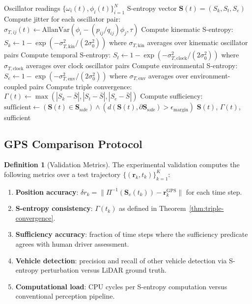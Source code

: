 \documentclass[twocolumn,10pt]{article}
\theoremstyle{definition}
\newtheorem{definition}[theorem]{Definition}
\theoremstyle{remark}
\newcommand{\Sent}{\mathbf{S}}
\begin{document}
\begin{algorithm}[t]
\caption{Real-Time S-Entropy Computation}
\label{alg:s-entropy}
\begin{algorithmic}[1]
\REQUIRE Oscillator readings $\{\omega_i(t), \phi_i(t)\}_{i=1}^N$
\ENSURE S-entropy vector $\Sent(t) = (S_k, S_t, S_e)$
\STATE Compute jitter for each oscillator pair:
  $\sigma_{T,ij}(t) \gets \mathrm{AllanVar}(\phi_i - (p_{ij}/q_{ij})\phi_j, \tau)$
\STATE Compute kinematic S-entropy:
  $S_k \gets 1 - \exp(-\sigma_{T,\mathrm{kin}}^2 / (2\sigma_0^2))$
  where $\sigma_{T,\mathrm{kin}}$ averages over kinematic oscillator pairs
\STATE Compute temporal S-entropy:
  $S_t \gets 1 - \exp(-\sigma_{T,\mathrm{clock}}^2 / (2\sigma_0^2))$
  where $\sigma_{T,\mathrm{clock}}$ averages over clock oscillator pairs
\STATE Compute environmental S-entropy:
  $S_e \gets 1 - \exp(-\sigma_{T,\mathrm{env}}^2 / (2\sigma_0^2))$
  where $\sigma_{T,\mathrm{env}}$ averages over environment-coupled pairs
\STATE Compute triple convergence:
  $\Gamma(t) \gets \max(|S_k - \bar{S}|, |S_t - \bar{S}|, |S_e - \bar{S}|)$
\STATE Compute sufficiency:
  $\mathrm{sufficient} \gets (\Sent(t) \in \Sent_{\mathrm{safe}})
  \wedge (d(\Sent(t), \partial\Sent_{\mathrm{safe}}) > \epsilon_{\mathrm{margin}})$
\RETURN $\Sent(t)$, $\Gamma(t)$, sufficient
\end{algorithmic}
\end{algorithm}

\subsection{GPS Comparison Protocol}

\begin{definition}[Validation Metrics]\label{def:validation}
The experimental validation computes the following metrics over a test
trajectory $\{(\mathbf{r}_k, t_k)\}_{k=1}^{K}$:
\begin{enumerate}[label=(\roman*)]
  \item \textbf{Position accuracy}: $\delta r_k = \|\Pi^{-1}(\Sent_e(t_k))
    - \mathbf{r}_k^{\mathrm{GPS}}\|$ for each time step.
  \item \textbf{S-entropy consistency}: $\Gamma(t_k)$ as defined in
    Theorem~\ref{thm:triple-convergence}.
  \item \textbf{Sufficiency accuracy}: fraction of time steps where the
    sufficiency predicate agrees with human driver assessment.
  \item \textbf{Vehicle detection}: precision and recall of other vehicle
    detection via S-entropy perturbation versus LiDAR ground truth.
  \item \textbf{Computational load}: CPU cycles per S-entropy computation
    versus conventional perception pipeline.
\end{enumerate}
\end{definition}
\end{document}
